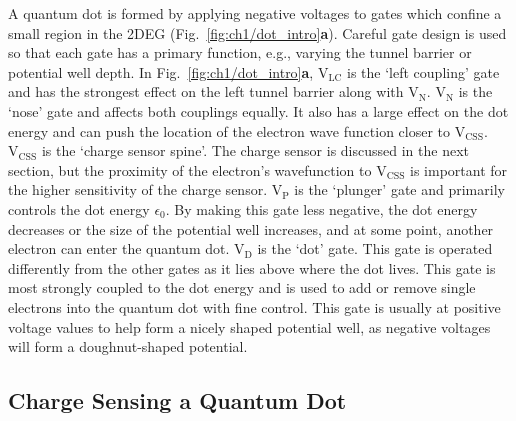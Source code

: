 A quantum dot is formed by applying negative voltages to gates which confine a small region in the 2DEG (Fig.~\ref{fig:ch1/dot_intro}\textbf{a}).
Careful gate design is used so that each gate has a primary function, e.g., varying the tunnel barrier or potential well depth. In Fig.~\ref{fig:ch1/dot_intro}\textbf{a}, $\mathrm{V_{LC}}$ is the `left coupling' gate and has the strongest effect on the left tunnel barrier along with $\mathrm{V_{N}}$. $\mathrm{V_{N}}$ is the `nose' gate and affects both couplings equally. It also has a large effect on the dot energy and can push the location of the electron wave function closer to $\mathrm{V_{CSS}}$. $\mathrm{V_{CSS}}$ is the `charge sensor spine'. The charge sensor is discussed in the next section, but the proximity of the electron's wavefunction to $\mathrm{V_{CSS}}$ is important for the higher sensitivity of the charge sensor. $\mathrm{V_{P}}$ is the `plunger' gate and primarily controls the dot energy $\epsilon_0$. By making this gate less negative, the dot energy decreases or the size of the potential well increases, and at some point, another electron can enter the quantum dot. $\mathrm{V_{D}}$ is the `dot' gate. This gate is operated differently from the other gates as it lies above where the dot lives. This gate is most strongly coupled to the dot energy and is used to add or remove single electrons into the quantum dot with fine control. This gate is usually at positive voltage values to help form a nicely shaped potential well, as negative voltages will form a doughnut-shaped potential. 





\afterpage{\clearpage}
\subsection{Charge Sensing a Quantum Dot}


